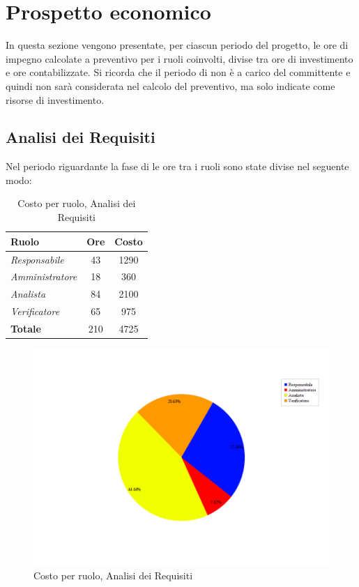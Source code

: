 \section{Prospetto economico}
In questa sezione vengono presentate, per ciascun periodo del progetto, le ore di impegno calcolate a preventivo per i ruoli coinvolti, divise tra ore di investimento e ore contabilizzate. Si ricorda che il periodo di \textit{\AdR} non è a carico del committente e quindi non sarà considerata nel calcolo del preventivo, ma solo indicate come risorse di investimento.
\subsection{Analisi dei Requisiti}
Nel periodo riguardante la fase di \textit{\AdR} le ore tra i ruoli sono state divise nel seguente modo:

\begin{table}[H]
	\begin{center}
		\begin{tabular}{|l|c|c|}
			\hline
			\textbf{Ruolo}	& \textbf{Ore} & \textbf{Costo} \\
			\hline
			\textit{Responsabile	}&	43	&	 1290	\\
			\hline
			\textit{Amministratore}	&	18	&	 360	\\
			\hline
			\textit{Analista}		&	84	&	 2100	\\
			\hline
			\textit{Verificatore}	&	65	&	 975	\\
			\hline
			\textbf{Totale} &	210	&	4725	\\
			\hline
		\end{tabular}
	\end{center}
	\caption{Costo per ruolo, Analisi dei Requisiti}
\end{table}

\begin{figure}[H]
	\centering
	\includegraphics[scale=0.5]{immagini/Grafi/CostoAR}
	\caption{Costo per ruolo, Analisi dei Requisiti}
\end{figure}

